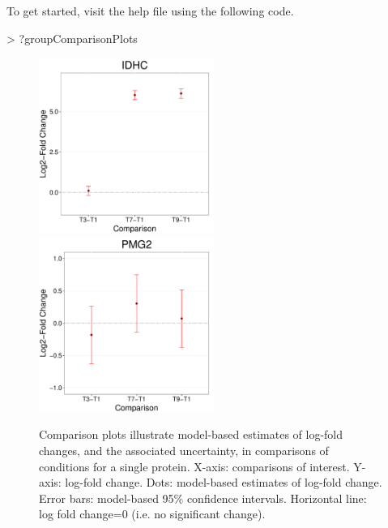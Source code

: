\documentclass[11pt]{article}
\begin{document}
To get started, visit the help file using the following code.
\begin{small}
\begin{Schunk}
\begin{Sinput}
> ?groupComparisonPlots
\end{Sinput}
\end{Schunk}
\end{small}

\vspace{-0.2in}
\begin{figure}[b!]
\begin{center}
\includegraphics[width=2.25in]{comparison1.pdf}
\includegraphics[width=2.25in]{comparison2.pdf}
\vspace{-0.3cm}
\caption{\small Comparison plots illustrate model-based estimates of log-fold changes, and the associated uncertainty, in comparisons of conditions for a single protein. X-axis: comparisons of interest. Y-axis: log-fold change. Dots: model-based estimates of log-fold change. Error bars: model-based 95\% confidence intervals. Horizontal line: log fold change=0 (i.e. no significant change).
\label{fig:SRMcomparison}}
\end{center}
\end{figure}

\vspace{-0.2in}


\clearpage
\end{document}
